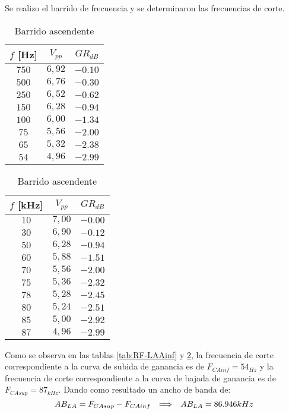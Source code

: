 Se realizo el barrido de frecuencia y se determinaron las frecuencias de corte.
\begin{table}[H]
\parbox{.45\textwidth}{  
    \centering
    \begin{tabular}{|c|c|c|}
        \hline
        $f$ [Hz] &  $V_{pp}$&$GR_{dB}$\\
        \hline
         $750$&$6,92$&$-0.10$\\ 
         $500$&$6,76$&$-0.30$\\ 
         $250$&$6,52$&$-0.62$\\ 
         $150$&$6,28$&$-0.94$\\ 
         $100$&$6,00$&$-1.34$\\ 
         $75$&$5,56$&$-2.00$\\
         $65$&$5,32$&$-2.38$\\
         $54$&$4,96$&$-2.99$\\
         \hline
    \end{tabular}
    \caption{Barrido descendente}
    \label{tab:RF-LAAinf}
    }
    \parbox{.45\textwidth}{
    \centering
    \begin{tabular}{|c|c|c|}
        \hline
        $f$ [kHz] &  $V_{pp}$&$GR_{dB}$\\
        \hline
         $10$&$7,00$&$-0.00$\\ 
         $30$&$6,90$&$-0.12$\\ 
         $50$&$6,28$&$-0.94$\\ 
         $60$&$5,88$&$-1.51$\\ 
         $70$&$5,56$&$-2.00$\\
         $75$&$5,36$&$-2.32$\\
         $78$&$5,28$&$-2.45$\\
         $80$&$5,24$&$-2.51$\\
         $85$&$5,00$&$-2.92$\\
         $87$&$4,96$&$-2.99$\\
         \hline
    \end{tabular}
    \caption{Barrido ascendente}
    \label{tab:RF-LAAsup}
    }
\end{table}
Como se observa en las tablas \ref{tab:RF-LAAinf} y \ref{tab:RF-LAAsup}, la frecuencia de corte correspondiente a la curva de subida de ganancia es de $F_{CAinf}=54_{Hz}$ y la frecuencia de corte correspondiente a la curva de bajada de ganancia es de $F_{CAsup}=87_{kHz}$. Dando como resultado un ancho de banda de:
\begin{equation*}
    AB_{LA} = F_{CAsup}-F_{CAinf}\hspace{0.25cm} \Longrightarrow \hspace{0.25cm} AB_{LA}=86.946 kHz
\end{equation*}

